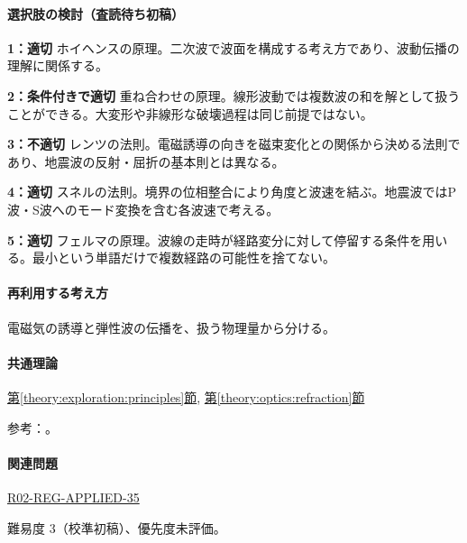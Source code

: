 \paragraph{選択肢の検討（査読待ち初稿）}\mbox{}\par

\noindent\textbf{1：適切} ホイヘンスの原理。二次波で波面を構成する考え方であり、波動伝播の理解に関係する。\par

\noindent\textbf{2：条件付きで適切} 重ね合わせの原理。線形波動では複数波の和を解として扱うことができる。大変形や非線形な破壊過程は同じ前提ではない。\par

\noindent\textbf{3：不適切} レンツの法則。電磁誘導の向きを磁束変化との関係から決める法則であり、地震波の反射・屈折の基本則とは異なる。\par

\noindent\textbf{4：適切} スネルの法則。境界の位相整合により角度と波速を結ぶ。地震波ではP波・S波へのモード変換を含む各波速で考える。\par

\noindent\textbf{5：適切} フェルマの原理。波線の走時が経路変分に対して停留する条件を用いる。最小という単語だけで複数経路の可能性を捨てない。\par

\paragraph{再利用する考え方} 電磁気の誘導と弾性波の伝播を、扱う物理量から分ける。

\paragraph{共通理論} \hyperref[theory:exploration:principles]{第\ref*{theory:exploration:principles}節}, \hyperref[theory:optics:refraction]{第\ref*{theory:optics:refraction}節}

\par 参考：\cite{mit_signals2010,stanford_downward2001,epa_seismic_reflection}。

\paragraph{関連問題} \hyperref[q:r02-reg-applied-35]{R02-REG-APPLIED-35}

\par 難易度 3（校準初稿）、優先度未評価。

